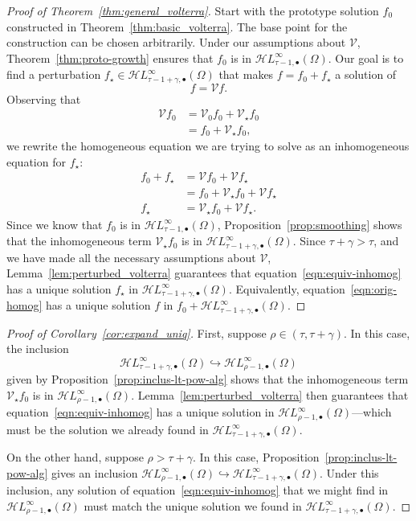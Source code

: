 \documentclass[final]{siamart220329}
\newcommand{\singexp}[2]{\mathcal{H}L^\infty_{#1, #2}}
\newcommand{\singexpalg}[1]{\singexp{#1}{\bullet}}
\newcommand{\volterra}{\mathcal{V}}
\newcommand{\hardpart}{\mathcal{V}_0}
\newcommand{\softpart}{\mathcal{V}_\star}
\newcommand{\solwhole}{f}
\newcommand{\solproto}{f_0}
\newcommand{\solptb}{f_\star}
\newcommand{\domain}{\Omega}
\begin{document}
\begin{proof}[Proof of Theorem~\ref{thm:general_volterra}]
Start with the prototype solution $\solproto$ constructed in Theorem~\ref{thm:basic_volterra}. The base point for the construction can be chosen arbitrarily. Under our assumptions about $\volterra$, Theorem~\ref{thm:proto-growth} ensures that $\solproto$ is in $\singexpalg{\tau-1}(\domain)$. Our goal is to find a perturbation $\solptb \in \singexpalg{\tau-1+\gamma}(\domain)$ that makes $\solwhole = \solproto + \solptb$ a solution of 
\begin{equation}\label{eqn:orig-homog}
\solwhole = \volterra \solwhole.
\end{equation}
Observing that
\begin{align*}
\volterra \solproto & = \hardpart\solproto + \softpart\solproto \\
& = \solproto + \softpart \solproto,
\end{align*}
we rewrite the homogeneous equation we are trying to solve as an inhomogeneous equation for $\solptb$:
\begin{align}
\solproto + \solptb & = \volterra\solproto + \volterra\solptb \nonumber \\
& = \solproto + \softpart\solproto + \volterra\solptb \nonumber \\
\solptb & = \softpart\solproto + \volterra\solptb. \label{eqn:equiv-inhomog}
\end{align}
Since we know that $\solproto$ is in $\singexpalg{\tau-1}(\domain)$, Proposition~\ref{prop:smoothing} shows that the inhomogeneous term $\softpart\solproto$ is in $\singexpalg{\tau-1+\gamma}(\domain)$. Since $\tau+\gamma > \tau$, and we have made all the necessary assumptions about $\volterra$, Lemma~\ref{lem:perturbed_volterra} guarantees that equation~\eqref{eqn:equiv-inhomog} has a unique solution $\solptb$ in $\singexpalg{\tau-1+\gamma}(\Omega)$. Equivalently, equation~\eqref{eqn:orig-homog} has a unique solution $f$ in $f_0 + \singexpalg{\tau-1+\gamma}(\domain)$.
\end{proof}
\begin{proof}[Proof of Corollary~\ref{cor:expand_uniq}]
First, suppose $\rho \in (\tau, \tau+\gamma)$. In this case, the inclusion
\[\singexpalg{\tau-1+\gamma}(\Omega) \hookrightarrow \singexpalg{\rho-1}(\Omega)\]
given by Proposition~\ref{prop:inclus-lt-pow-alg} shows that the inhomogeneous term $\softpart\solproto$ is in $\singexpalg{\rho-1}(\Omega)$. Lemma~\ref{lem:perturbed_volterra} then guarantees that equation~\eqref{eqn:equiv-inhomog} has a unique solution in $\singexpalg{\rho-1}(\Omega)$---which must be the solution we already found in $\singexpalg{\tau-1+\gamma}(\Omega)$.

On the other hand, suppose $\rho > \tau+\gamma$. In this case, Proposition~\ref{prop:inclus-lt-pow-alg} gives an inclusion $\singexpalg{\rho-1}(\Omega) \hookrightarrow \singexpalg{\tau-1+\gamma}(\Omega)$. Under this inclusion, any solution of equation~\eqref{eqn:equiv-inhomog} that we might find in $\singexpalg{\rho-1}(\Omega)$ must match the unique solution we found in $\singexpalg{\tau-1+\gamma}(\Omega)$.
\end{proof}
\end{document}
